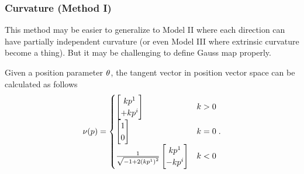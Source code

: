 \documentclass[stu, babel, american, biblatex, a4paper, leqno, draftall]{apa7}
\begin{document}
\subsubsection{Curvature (Method I)}
This method may be easier to generalize to
Model II where each direction can have partially independent curvature
(or even Model III where extrinsic curvature become a thing).
But it may be challenging to define Gauss map properly.
\begin{lemma}\label{M:Normal}
    Given a position parameter $\tensor{\theta}{}$,
    the tangent vector in position vector space can be calculated as follows
    \begin{equation*}
        \nu(p)
        =
        \begin{cases}
            \begin{bmatrix}
                k\tensor{p}{^1}  \\
                +k\tensor{p}{^i} \\
            \end{bmatrix} & k>0     \\
            \begin{bmatrix}
                1 \\
                0 \\
            \end{bmatrix}     & k=0 \\
            \frac{1}{\sqrt{-1+2\left(k\tensor{p}{^1}\right)^2}}
            \begin{bmatrix}
                k\tensor{p}{^1}  \\
                -k\tensor{p}{^i} \\
            \end{bmatrix} & k<0
        \end{cases}
        \text{.}
    \end{equation*}
\end{lemma}
\end{document}
